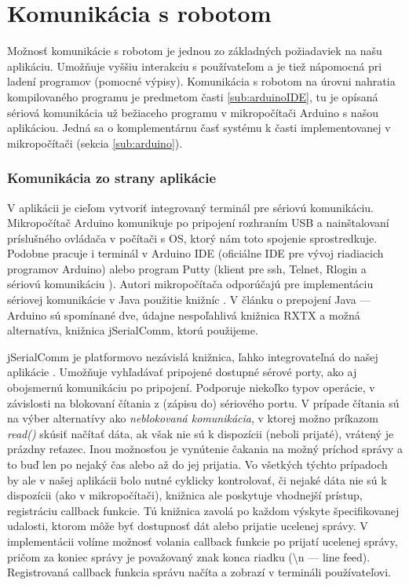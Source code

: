 \section{Komunikácia s robotom}
Možnosť komunikácie s robotom je jednou zo základných požiadaviek na našu aplikáciu. Umožňuje vyššiu interakciu s používateľom a je tiež nápomocná pri ladení programov (pomocné výpisy). Komunikácia s robotom na úrovni nahratia kompilovaného programu je predmetom časti \ref{sub:arduinoIDE}, tu je opísaná sériová komunikácia už bežiaceho programu v mikropočítači Arduino s našou aplikáciou. Jedná sa o komplementárnu časť systému k časti implementovanej v mikropočítači (sekcia \ref{sub:arduino}).

\subsubsection{Komunikácia zo strany aplikácie}
V aplikácii je cieľom vytvoriť integrovaný terminál pre sériovú komunikáciu. Mikropočítač Arduino komunikuje po pripojení rozhraním USB a nainštalovaní príslušného ovládača v počítači s OS, ktorý nám toto spojenie sprostredkuje. Podobne pracuje i terminál v Arduino IDE (oficiálne IDE pre vývoj riadiacich programov Arduino) alebo program Putty (klient pre ssh, Telnet, Rlogin a sériovú komunikáciu \cite{putty}). Autori mikropočítača odporúčajú pre implementáciu sériovej komunikácie v Java použitie knižníc \cite{arduinoAndJava}. V článku o prepojení Java --- Arduino sú spomínané dve, údajne nespoľahlivá knižnica RXTX a možná alternatíva, knižnica jSerialComm, ktorú použijeme. 

jSerialComm je platformovo nezávislá knižnica, ľahko integrovateľná do našej aplikácie \cite{jSerialComm}. Umožňuje vyhľadávať pripojené dostupné sérové porty, ako aj obojsmernú komunikáciu po pripojení. Podporuje niekoľko typov operácie, v závislosti na blokovaní čítania z (zápisu do) sériového portu. V prípade čítania sú na výber alternatívy ako \textit{neblokovaná komunikácia}, v ktorej možno príkazom \textit{read()} skúsiť načítať dáta, ak však nie sú k dispozícii (neboli prijaté), vrátený je prázdny reťazec. Inou možnosťou je vynútenie čakania na možný príchod správy a to buď len po nejaký čas alebo až do jej prijatia. Vo všetkých týchto prípadoch by ale v našej aplikácii bolo nutné cyklicky kontrolovať, či nejaké dáta nie sú k dispozícii (ako v mikropočítači), knižnica ale poskytuje vhodnejší prístup, registráciu callback funkcie. Tú knižnica zavolá po každom výskyte špecifikovanej udalosti, ktorom môže byť dostupnosť dát alebo prijatie ucelenej správy. V implementácii volíme možnosť volania callback funkcie po prijatí ucelenej správy, pričom za koniec správy je považovaný znak konca riadku (\textbackslash n --- line feed). Registrovaná callback funkcia správu načíta a zobrazí v termináli používateľovi.

